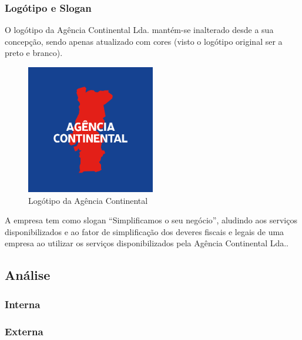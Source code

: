 \subsubsection{Logótipo e Slogan}

O logótipo da Agência Continental Lda. mantém-se inalterado desde a sua concepção, sendo apenas atualizado com cores (visto o logótipo original ser a preto e branco).

\begin{figure}[h]
\centering
\includegraphics[width=0.5\textwidth]{ag_continental}
\caption{Logótipo da Agência Continental}
\end{figure}

A empresa tem como slogan ``Simplificamos o seu negócio'', aludindo aos serviços disponibilizados e ao fator de simplificação dos deveres fiscais e legais de uma empresa ao utilizar os serviços disponibilizados pela Agência Continental Lda..

\subsection{Análise}


\subsubsection{Interna}


\subsubsection{Externa}

